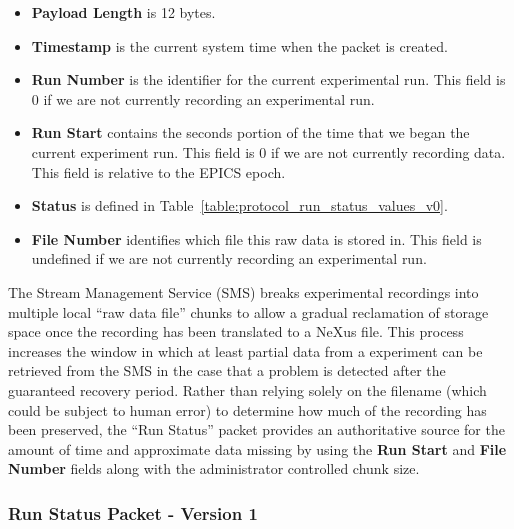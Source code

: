 \begin{itemize}
\item{\bf Payload Length} is 12 bytes.
\item{\bf Timestamp} is the current system time when the packet is created.
\item{\bf Run Number} is the identifier for the current experimental run. This
field is 0 if we are not currently recording an experimental run.
\item{\bf Run Start} contains the seconds portion of the time that we began
the current experiment run. This field is 0 if we are not currently recording
data. This field is relative to the EPICS epoch.
\item{\bf Status} is defined in
Table~\ref{table:protocol_run_status_values_v0}.
\item{\bf File Number} identifies which file this raw data is stored in.
This field is undefined if we are not currently recording an
experimental run.
\end{itemize}

The Stream Management Service (SMS) breaks experimental recordings into multiple
local ``raw data file''
chunks to allow a gradual reclamation of storage space once the recording
has been translated to a NeXus file. This process increases the window in
which at least partial data from a experiment can be retrieved from the SMS
in the case that a problem is detected after the guaranteed recovery period.
Rather than relying solely on the filename (which could be subject to human
error) to determine how much of the recording has been preserved, the
``Run Status'' packet provides an authoritative source for the amount
of time and approximate data missing by using the {\bf Run Start} and
{\bf File Number} fields along with the administrator controlled chunk size.


\newpage
\subsubsection{Run Status Packet  - Version 1}
\label{section:protocol_run_status_v1}

